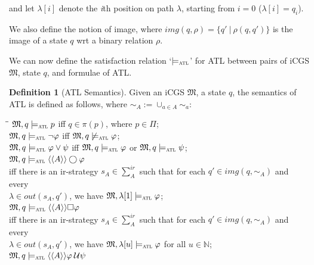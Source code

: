 \documentclass{article}
\theoremstyle{theorem}
\theoremstyle{lemma}
\theoremstyle{definition}
\newtheorem{definition}{Definition}[section]
\theoremstyle{remark}
\begin{document}
and let $\lambda[i]$ denote the \textit{i}th position on path $\lambda$, starting from $i=0$ ($\lambda[i]=q_i$).
\par We also define the notion of image, where $img(q, \rho)=\{q' \:|\: \rho (q, q')\}$ is the image of a state $q$ wrt a binary relation $\rho$.
\par We can now define the satisfaction relation `$\models_\textsc{atl}$' for ATL between pairs of iCGS $\mathfrak{M}$, state $q$, and formulae of ATL.
\begin{definition}[ATL Semantics]
  Given an iCGS $\mathfrak{M}$, a state $q$, the semantics of ATL is defined as follows, where $\sim_A:= \cup_{a \in A} \sim_a$:
    \begin{tabbing}
        \hspace{0.5cm} \= \hspace*{8cm}\= \kill
        \> $\mathfrak{M},q \models_\textsc{atl} p$ \> iff $q \in \pi(p)$, where $p \in \Pi$;\\
        \> $\mathfrak{M},q \models_\textsc{atl} \neg \varphi$ \> iff $\mathfrak{M},q \not\models_\textsc{atl} \varphi$;\\
        \> $\mathfrak{M},q \models_\textsc{atl} \varphi \vee \psi$ \> iff $\mathfrak{M},q \models_\textsc{atl} \varphi$ or $\mathfrak{M},q \models_\textsc{atl} \psi$;\\    
        \> $\mathfrak{M},q \models_\textsc{atl} \langle{\langle{A}\rangle}\rangle \bigcirc \varphi$\\
        \>\hspace{1cm} iff there is an ir-strategy $s_A \in \sum_{A}^{ir}$ such that for each $q' \in img(q, \sim_A)$ and every \\
        \>\hspace{1cm} $\lambda \in out(s_A, q')$, we have $\mathfrak{M}, \lambda[1] \models_\textsc{atl} \varphi$; \\
        \> $\mathfrak{M},q \models_\textsc{atl} \langle{\langle{A}\rangle}\rangle \square \varphi$ \\
        \>\hspace{1cm} iff  there is an ir-strategy $s_A \in \sum_{A}^{ir}$ such that for each $q' \in img(q, \sim_A)$ and every \\
        \>\hspace{1cm} $\lambda \in out(s_A, q')$, we have $\mathfrak{M}, \lambda[u] \models_\textsc{atl} \varphi$ for all $u \in \mathbb{N}$; \\
        \> $\mathfrak{M},q \models_\textsc{atl} \langle \langle A \rangle \rangle \varphi \: \mathcal{U} \psi$ \\

\end{tabbing}
\end{definition}
\end{document}
